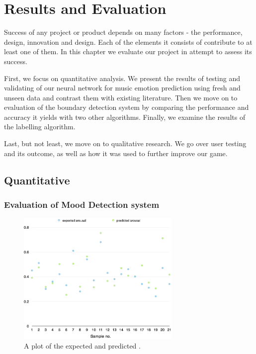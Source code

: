 
\chapter{Results and Evaluation} %

\label{Chapter6} %



Success of any project or product depends on many factors - the performance, design, innovation and design. Each of the elements it consists of contribute to at least one of them. 
In this chapter we evaluate our project in attempt to assess its success.

First, we focus on quantitative analysis. We present the results of testing and validating of our neural network for music emotion prediction using fresh and unseen data and contrast them with existing literature. Then we move on to evaluation of the boundary detection system by comparing the performance and accuracy it yields with two other algorithms. Finally, we examine the results of the labelling algorithm.

Last, but not least, we move on to qualitative research. We go over user testing and its outcome, as well as how it was used to further improve our game. 

\section{Quantitative}
\vspace{10pt}

\subsection{Evaluation of Mood Detection system}

\begin{figure}[t]
    \includegraphics[width=0.7\textwidth]{Figures/finalarousal}
    \centering

  \caption{A plot of the expected and predicted .}
  \label{fig:anneval}
\end{figure}


